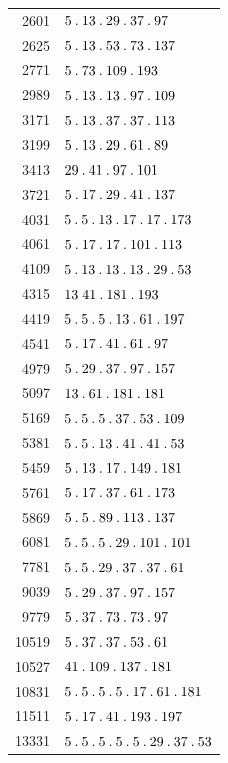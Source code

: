 \begin{longtable}{@{}r|l@{}}
2601 & $5\pdot 13\pdot 29\pdot 37\pdot 97$\\
2625 & $5\pdot 13\pdot 53\pdot 73\pdot 137$\\
2771 & $5\pdot 73\pdot 109\pdot 193$\\
2989 & $5\pdot 13\pdot 13\pdot 97\pdot 109$\\
3171 & $5\pdot 13\pdot 37\pdot 37\pdot 113$\\
3199 & $5\pdot 13\pdot 29\pdot 61\pdot 89$\\
3413 & $29\pdot 41\pdot 97\pdot 101$\\
3721 & $5\pdot 17\pdot 29\pdot 41\pdot 137$\\
4031 & $5\pdot 5\pdot 13\pdot 17\pdot 17\pdot 173$\\
4061 & $5\pdot 17\pdot 17\pdot 101\pdot 113$\\
4109 & $5\pdot 13\pdot 13\pdot 13\pdot 29\pdot 53$\\
4315 & $13\;41\pdot 181\pdot 193$\\
4419 & $5\pdot 5\pdot 5\pdot 13\pdot 61\pdot 197$\\
4541 & $5\pdot 17\pdot 41\pdot 61\pdot 97$\\
4979 & $5\pdot 29\pdot 37\pdot 97\pdot 157$\\
5097 & $13\pdot 61\pdot 181\pdot 181$\\
5169 & $5\pdot 5\pdot 5\pdot 37\pdot 53\pdot 109$\\
5381 & $5\pdot 5\pdot 13\pdot 41\pdot 41\pdot 53$\\
5459 & $5\pdot 13\pdot 17\pdot 149\pdot 181$\\
5761 & $5\pdot 17\pdot 37\pdot 61\pdot 173$\\
5869 & $5\pdot 5\pdot 89\pdot 113\pdot 137$\\
6081 & $5\pdot 5\pdot 5\pdot 29\pdot 101\pdot 101$\\
7781 & $5\pdot 5\pdot 29\pdot 37\pdot 37\pdot 61$\\
9039 & $5\pdot 29\pdot 37\pdot 97\pdot 157$\\
9779 & $5\pdot 37\pdot 73\pdot 73\pdot 97$\\
10519 & $5\pdot 37\pdot 37\pdot 53\pdot 61$\\
10527 & $41\pdot 109\pdot 137\pdot 181$\\
10831 & $5\pdot 5\pdot 5\pdot 5\pdot 17\pdot 61\pdot 181$\\
11511 & $5\pdot 17\pdot 41\pdot 193\pdot 197$\\
13331 & $5\pdot 5\pdot 5\pdot 5\pdot 5\pdot 29\pdot 37\pdot 53$\\

\end{longtable}
